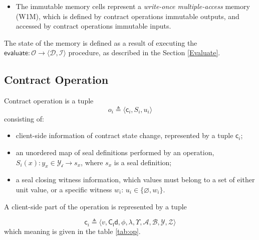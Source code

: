 \documentclass[a4paper]{article}
\begin{document}
\begin{multicols}{2}
\begin{itemize}
\item The immutable memory cells represent a \emph{write-once multiple-access} memory (W1M),
  which is defined by contract operations immutable outputs,
  and accessed by contract operations immutable inputs.
\end{itemize}

The state of the memory is defined as a result of executing the
$\mathsf{evaluate}: \mathcal{O} \rightarrow \langle \mathcal{D}, \mathcal{I} \rangle$ procedure,
as described in the Section \ref{Evaluate}.


\subsection{Contract Operation}\label{Operation}

Contract operation is a tuple
\begin{equation}
o_i \triangleq \langle \mathsf{c}_i, S_i, u_i \rangle
\end{equation}
\noident
consisting of:

\begin{itemize}
\item client-side information of contract state change, represented by a tuple $\mathsf{c}_i$;
\item an unordered map of seal definitions performed by an operation,
  $S_i(x): y_x \in \mathcal{Y_i} \rightarrow s_x$, where $s_x$ is a seal definition;
\item a seal closing witness information,
  which values must belong to a set of either unit value, or a specific witness $w_i$:
  $u_i \in \{ \varnothing, w_i \}$.
\end{itemize}

A client-side part of the operation is represented by a tuple

\begin{equation}
\mathsf{c}_i \triangleq \langle v, \mathsf{C_Id}, \phi, \lambda, \Upsilon, \mathcal{A}, \mathcal{B}, \mathcal{Y}, \mathcal{Z} \rangle
\end{equation}
\noident
which meaning is given in the table \ref{tab:op}.

\end{multicols}
\end{document}
